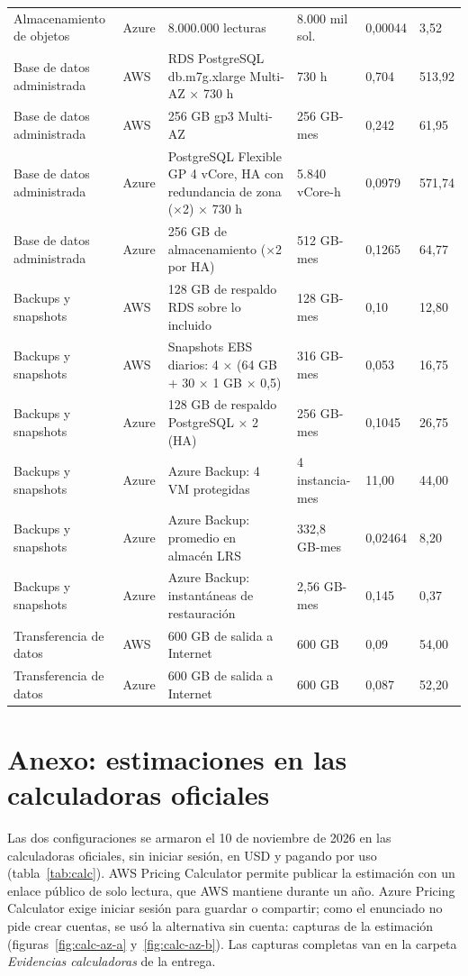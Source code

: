 \documentclass[11pt,letterpaper]{article}
\begin{document}
\begin{longtable}{L{2.4cm}L{0.95cm}L{5.0cm}R{2.1cm}R{1.4cm}R{1.4cm}}
Almacenamiento de objetos & Azure & 8.000.000 lecturas & 8.000 mil sol. & 0,00044 & 3,52\\
Base de datos administrada & AWS & RDS PostgreSQL db.m7g.xlarge Multi-AZ × 730 h & 730 h & 0,704 & 513,92\\
Base de datos administrada & AWS & 256 GB gp3 Multi-AZ & 256 GB-mes & 0,242 & 61,95\\
Base de datos administrada & Azure & PostgreSQL Flexible GP 4 vCore, HA con redundancia de zona (×2) × 730 h & 5.840 vCore-h & 0,0979 & 571,74\\
Base de datos administrada & Azure & 256 GB de almacenamiento (×2 por HA) & 512 GB-mes & 0,1265 & 64,77\\
Backups y snapshots & AWS & 128 GB de respaldo RDS sobre lo incluido & 128 GB-mes & 0,10 & 12,80\\
Backups y snapshots & AWS & Snapshots EBS diarios: 4 × (64 GB + 30 × 1 GB × 0,5) & 316 GB-mes & 0,053 & 16,75\\
Backups y snapshots & Azure & 128 GB de respaldo PostgreSQL × 2 (HA) & 256 GB-mes & 0,1045 & 26,75\\
Backups y snapshots & Azure & Azure Backup: 4 VM protegidas & 4 instancia-mes & 11,00 & 44,00\\
Backups y snapshots & Azure & Azure Backup: promedio en almacén LRS & 332,8 GB-mes & 0,02464 & 8,20\\
Backups y snapshots & Azure & Azure Backup: instantáneas de restauración & 2,56 GB-mes & 0,145 & 0,37\\
Transferencia de datos & AWS & 600 GB de salida a Internet & 600 GB & 0,09 & 54,00\\
Transferencia de datos & Azure & 600 GB de salida a Internet & 600 GB & 0,087 & 52,20\\
\end{longtable}
\endgroup

\section{Anexo: estimaciones en las calculadoras oficiales}\label{anx:calculadoras}
Las dos configuraciones se armaron el 10 de noviembre de 2026 en las calculadoras oficiales, sin iniciar sesión, en USD y pagando por uso (tabla~\ref{tab:calc}). AWS Pricing Calculator permite publicar la estimación con un enlace público de solo lectura, que AWS mantiene durante un año. Azure Pricing Calculator exige iniciar sesión para guardar o compartir; como el enunciado no pide crear cuentas, se usó la alternativa sin cuenta: capturas de la estimación (figuras~\ref{fig:calc-az-a} y~\ref{fig:calc-az-b}). Las capturas completas van en la carpeta \emph{Evidencias calculadoras} de la entrega.
\end{document}
